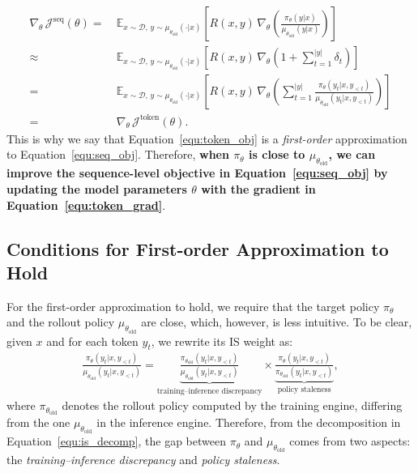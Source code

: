 \documentclass{article}
\begin{document}
\begin{align*}
\nabla_\theta \, \mathcal{J}^\text{seq}(\theta)
= &\
\mathbb{E}_{ x \sim \mathcal{D}, \, y \sim \mu_{ \theta_\text{old} } ( \cdot | x ) } \left[ 
    R(x, y) \, \nabla_\theta \left(
    \frac{ \pi_\theta ( y | x ) }{ \mu_{ \theta_\text{old} } ( y | x ) }
    \right)
\right] \\
\approx &\
\mathbb{E}_{ x \sim \mathcal{D}, \, y \sim \mu_{ \theta_\text{old} } ( \cdot | x ) } \left[ 
    R(x, y) \, \nabla_\theta \left(
    1 + \sum_{t=1}^{|y|} \delta_t
    \right)
\right] \\
= &\
\mathbb{E}_{ x \sim \mathcal{D}, \, y \sim \mu_{ \theta_\text{old} } ( \cdot | x ) } \left[ 
    R(x, y) \, \nabla_\theta \left(
    \sum_{t=1}^{|y|} \frac{ \pi_\theta ( y_t | x, y_{<t} ) }{ \mu_{ \theta_\text{old} } ( y_t | x, y_{<t} ) }
    \right)
\right] \\
= &\
\nabla_\theta \, \mathcal{J}^\text{token}(\theta).
\end{align*}
This is why we say that Equation~\eqref{equ:token_obj} is a \textit{first-order} approximation to Equation~\eqref{equ:seq_obj}.
Therefore, \textbf{when \( \pi_\theta \) is close to \( \mu_{ \theta_\text{old} } \), we can improve the sequence-level objective in Equation~\eqref{equ:seq_obj} by updating the model parameters \( \theta \) with the gradient in Equation~\eqref{equ:token_grad}}.

\subsection{Conditions for First-order Approximation to Hold}

For the first-order approximation to hold, we require that the target policy \( \pi_\theta \) and the rollout policy \( \mu_{ \theta_\text{old} } \) are close, which, however, is less intuitive.
To be clear, given \(x\) and for each token \( y_t \), we rewrite its IS weight as:
\begin{align}
\label{equ:is_decomp}
\frac{ \pi_\theta ( y_t | x, y_{<t} ) }{ \mu_{ \theta_\text{old} } ( y_t | x, y_{<t} ) }
=
\underbrace{
    \frac{ \pi_{ \theta_\text{old} } ( y_t | x, y_{<t} ) }{ \mu_{ \theta_\text{old} } ( y_t | x, y_{<t} ) } 
}_\text{training–inference discrepancy}
\times 
\underbrace{
\frac{ \pi_\theta ( y_t | x, y_{<t} ) }{ \pi_{ \theta_\text{old} } ( y_t | x, y_{<t} ) }
}_\text{policy staleness},
\end{align}
where \( \pi_{ \theta_\text{old} } \) denotes the rollout policy computed by the training engine, differing from the one \( \mu_{ \theta_\text{old} } \) in the inference engine.
Therefore, from the decomposition in Equation~\eqref{equ:is_decomp}, the gap between \( \pi_\theta \) and \( \mu_{ \theta_\text{old} } \) comes from two aspects: the \textit{training–inference discrepancy} and \textit{policy staleness}.
\end{document}
